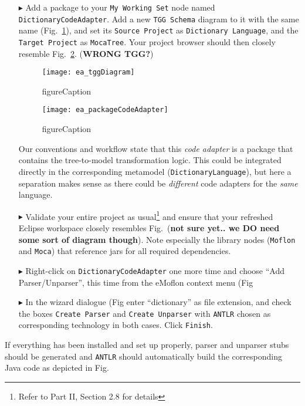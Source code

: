 \begin{enumerate}
\newpage

\item[$\blacktriangleright$] Add a package to your \texttt{My Working Set} node named \texttt{Dic\-tion\-ary\-Code\-Adapter}. Add a new \texttt{TGG Schema}
diagram to it with the same name (Fig.~\ref{ea:tggDiagram}), and set its \texttt{Source Project} as \texttt{Dictionary Language}, and the \texttt{Target
Project} as \texttt{MocaTree}. Your project browser should then closely resemble Fig.~\ref{ea:adapterPackageBrowser}. ({\bf WRONG TGG?})

\begin{figure}[htpb]
\begin{center}
  \texttt{[image: ea\_tggDiagram]}
  \caption{figureCaption}
  \label{ea:tggDiagram}
\end{center}
\end{figure}

\begin{figure}[htpb]
\begin{center}
  \texttt{[image: ea\_packageCodeAdapter]}
  \caption{figureCaption}
  \label{ea:adapterPackageBrowser}
\end{center}
\end{figure}

Our conventions and workflow state that this \emph{code adapter} is a package that contains the tree-to-model transformation logic. This could be integrated
directly in the corresponding metamodel (\texttt{Dic\-tion\-ary\-Language}), but here a separation makes sense as there could be \emph{different} code adapters
for the \emph{same} language.

\item[$\blacktriangleright$] Validate your entire project as usual\footnote{Refer to Part II, Section 2.8 for details} and ensure that your refreshed Eclipse
workspace closely resembles Fig.~({\bf not sure yet.. we DO need some sort of diagram though}). Note especially the library nodes (\texttt{Moflon} and
\texttt{Moca}) that reference jars for all required dependencies. 

\item[$\blacktriangleright$] Right-click on \texttt{DictionaryCodeAdapter} one more time and choose ``Add Parser/Unparser'', this time from the eMoflon context
menu (Fig~ %
 
\item[$\blacktriangleright$] In the wizard dialogue (Fig %
enter ``dictionary'' as file extension, and check the boxes \texttt{Create Parser} and \texttt{Create Unparser} with \texttt{ANTLR} chosen as corresponding
 technology in both cases.  Click \texttt{Finish}.

\end{enumerate}

If everything has been installed and set up properly, parser and unparser stubs should be generated and \texttt{ANTLR} should automatically build the
corresponding Java code as depicted in Fig.~%

